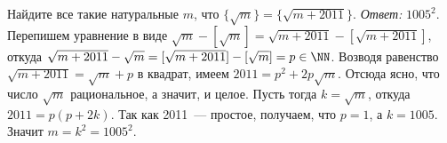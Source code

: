 \problem
Найдите все такие натуральные $m$, что
$\{ \sqrt{m} \} = \{ \sqrt{m+2011} \}$.
\solution
\emph{Ответ:} $1005^2$.
Перепишем уравнение в виде
$\sqrt{m} - [\sqrt{m}] = \sqrt{m + 2011} - [\sqrt{m + 2011}]$,
откуда
\(
    \sqrt{m + 2011} - \sqrt{m}
=
    [\sqrt{m + 2011}] - [\sqrt{m}]
=
    p \in \NN
\).
Возводя равенство $\sqrt{m + 2011} = \sqrt{m} + p$ в квадрат, имеем
$2011 = p^2 + 2 p \sqrt{m}$.
Отсюда ясно, что число $\sqrt{m}$ рациональное, а значит, и целое.
Пусть тогда $k = \sqrt{m}$, откуда $2011 = p (p + 2 k)$.
Так как 2011~--- простое, получаем, что $p=1$, а $k = 1005$.
Значит $m = k^2 = 1005^2$.
\endproblem
